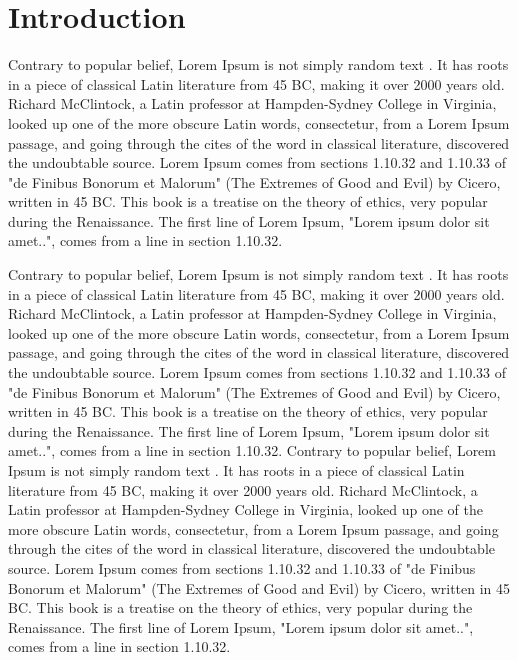 \documentclass[twoside]{ASDJ}
\begin{document}
\section{Introduction}
Contrary to popular belief, Lorem Ipsum is not simply random text  \cite{lorem}. It has roots in a piece of classical Latin literature from 45 BC, making it over 2000 years old. Richard McClintock, a Latin professor at Hampden-Sydney College in Virginia, looked up one of the more obscure Latin words, consectetur, from a Lorem Ipsum passage, and going through the cites of the word in classical literature, discovered the undoubtable source. Lorem Ipsum comes from sections 1.10.32 and 1.10.33 of "de Finibus Bonorum et Malorum" (The Extremes of Good and Evil) by Cicero, written in 45 BC. This book is a treatise on the theory of ethics, very popular during the Renaissance. The first line of Lorem Ipsum, "Lorem ipsum dolor sit amet..", comes from a line in section 1.10.32.

Contrary to popular belief, Lorem Ipsum is not simply random text  \cite{lorem}. It has roots in a piece of classical Latin literature from 45 BC, making it over 2000 years old. Richard McClintock, a Latin professor at Hampden-Sydney College in Virginia, looked up one of the more obscure Latin words, consectetur, from a Lorem Ipsum passage, and going through the cites of the word in classical literature, discovered the undoubtable source. Lorem Ipsum comes from sections 1.10.32 and 1.10.33 of "de Finibus Bonorum et Malorum" (The Extremes of Good and Evil) by Cicero, written in 45 BC. This book is a treatise on the theory of ethics, very popular during the Renaissance. The first line of Lorem Ipsum, "Lorem ipsum dolor sit amet..", comes from a line in section 1.10.32.
Contrary to popular belief, Lorem Ipsum is not simply random text  \cite{lorem}. It has roots in a piece of classical Latin literature from 45 BC, making it over 2000 years old. Richard McClintock, a Latin professor at Hampden-Sydney College in Virginia, looked up one of the more obscure Latin words, consectetur, from a Lorem Ipsum passage, and going through the cites of the word in classical literature, discovered the undoubtable source. Lorem Ipsum comes from sections 1.10.32 and 1.10.33 of "de Finibus Bonorum et Malorum" (The Extremes of Good and Evil) by Cicero, written in 45 BC. This book is a treatise on the theory of ethics, very popular during the Renaissance. The first line of Lorem Ipsum, "Lorem ipsum dolor sit amet..", comes from a line in section 1.10.32.
\end{document}
